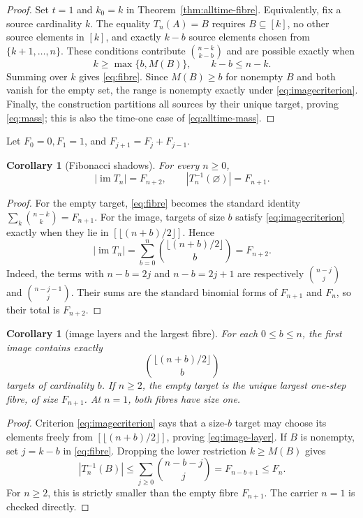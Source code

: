 \documentclass[a4paper,11pt]{amsart}
\newtheorem{corollary}[theorem]{Corollary}
\theoremstyle{remark}
\newcommand{\im}{\operatorname{im}}
\begin{document}
\begin{proof}
Set $t=1$ and $k_0=k$ in Theorem~\ref{thm:alltime-fibre}.  Equivalently, fix
a source cardinality $k$.  The equality $T_n(A)=B$ requires
$B\subseteq[k]$, no other source elements in $[k]$, and exactly $k-b$
source elements chosen from $\{k+1,\ldots,n\}$.  These conditions contribute
$\binom{n-k}{k-b}$ and are possible exactly when
\[
 k\geq\max\{b,M(B)\},\qquad k-b\leq n-k.
\]
Summing over $k$ gives \eqref{eq:fibre}.  Since $M(B)\geq b$ for nonempty
$B$ and both vanish for the empty set, the range is nonempty exactly under
\eqref{eq:imagecriterion}.  Finally, the construction partitions all sources
by their unique target, proving \eqref{eq:mass}; this is also the time-one
case of \eqref{eq:alltime-mass}.
\end{proof}

Let $F_0=0,F_1=1$, and $F_{j+1}=F_j+F_{j-1}$.

\begin{corollary}[Fibonacci shadows]\label{cor:fibonacci}
For every $n\geq0$,
\begin{equation}\label{eq:imagecount}
 |\im T_n|=F_{n+2},\qquad |T_n^{-1}(\varnothing)|=F_{n+1}.
\end{equation}
\end{corollary}

\begin{proof}
For the empty target, \eqref{eq:fibre} becomes the standard identity
$\sum_k\binom{n-k}{k}=F_{n+1}$.  For the image, targets of size $b$ satisfy
\eqref{eq:imagecriterion} exactly when they lie in
$[\lfloor(n+b)/2\rfloor]$.  Hence
\[
 |\im T_n|=\sum_{b=0}^n
 \binom{\lfloor(n+b)/2\rfloor}{b}=F_{n+2}.
\]
Indeed, the terms with $n-b=2j$ and $n-b=2j+1$ are respectively
$\binom{n-j}{j}$ and $\binom{n-j-1}{j}$.  Their sums are the standard
binomial forms of $F_{n+1}$ and $F_n$, so their total is $F_{n+2}$.
\end{proof}

\begin{corollary}[image layers and the largest fibre]\label{cor:extremal}
For each $0\leq b\leq n$, the first image contains exactly
\begin{equation}\label{eq:image-layer}
 \binom{\lfloor(n+b)/2\rfloor}{b}
\end{equation}
targets of cardinality $b$.  If $n\geq2$, the empty target is the unique
largest one-step fibre, of size $F_{n+1}$.  At $n=1$, both fibres have size
one.
\end{corollary}

\begin{proof}
Criterion \eqref{eq:imagecriterion} says that a size-$b$ target may choose
its elements freely from $[\lfloor(n+b)/2\rfloor]$, proving
\eqref{eq:image-layer}.  If $B$ is nonempty, set $j=k-b$ in
\eqref{eq:fibre}.  Dropping the lower restriction $k\geq M(B)$ gives
\[
 |T_n^{-1}(B)|\leq
 \sum_{j\geq0}\binom{n-b-j}{j}=F_{n-b+1}\leq F_n.
\]
For $n\geq2$, this is strictly smaller than the empty fibre $F_{n+1}$.
The carrier $n=1$ is checked directly.
\end{proof}
\end{document}
